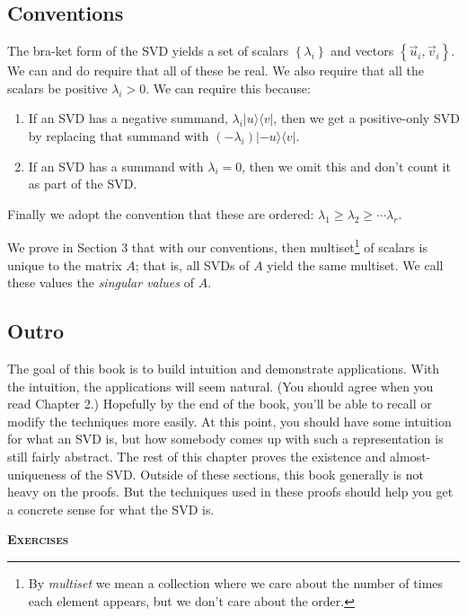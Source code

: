 \documentclass{amsbook}
\begin{document}
\subsection{Conventions}

The bra-ket form of the SVD yields a set of scalars $\left\{\lambda_i\right\}$ and vectors $\left\{\vec u_i, \vec v_i\right\}$.  We can and do require that all of these be real.  We also require that all the scalars be positive $\lambda_i>0$.  We can require this because:

\begin{enumerate}
\item If an SVD has a negative summand, $\lambda_i|u\rangle\langle v|$, then we get a positive-only SVD by replacing that summand with $(-\lambda_i)|-u\rangle\langle v|$.
\item If an SVD has a summand with $\lambda_i=0$, then we omit this and don't count it as part of the SVD.
\end{enumerate}

Finally we adopt the convention that these are ordered:  $\lambda_1\geq\lambda_2\geq\cdots\lambda_r$.

We prove in Section 3 that with our conventions, then multiset\footnote{By {\em multiset} we mean a collection where we care about the number of times each element appears, but we don't care about the order.} of scalars is unique to the matrix $A$; that is, all SVDs of $A$ yield the same multiset.  We call these values the {\em singular values} of $A$.

\subsection{Outro}

The goal of this book is to build intuition and demonstrate applications.  With the intuition, the applications will seem natural.  (You should agree when you read Chapter 2.)  Hopefully by the end of the book, you'll be able to recall or modify the techniques more easily.  At this point, you should have some intuition for what an SVD is, but how somebody comes up with such a representation is still fairly abstract.  The rest of this chapter proves the existence and almost-uniqueness of the SVD.  Outside of these sections, this book generally is not heavy on the proofs.  But the techniques used in these proofs should help you get a concrete sense for what the SVD is.

{\bfseries\scshape\Large Exercises}
\end{document}
